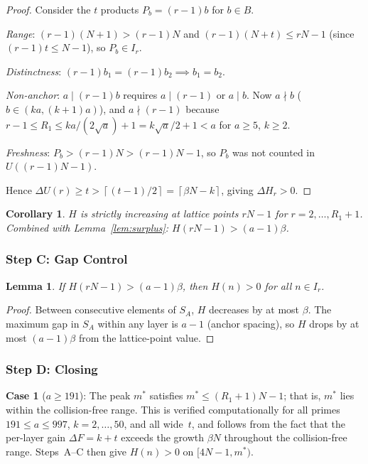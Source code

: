 \documentclass[11pt,a4paper]{article}
\newtheorem{lemma}[theorem]{Lemma}
\newtheorem{corollary}[theorem]{Corollary}
\theoremstyle{definition}
\newcommand{\ceil}[1]{\left\lceil #1 \right\rceil}
\begin{document}
\begin{proof}
Consider the $t$ products $P_b = (r-1)b$ for $b \in B$.

\emph{Range}: $(r-1)(N+1) > (r-1)N$ and $(r-1)(N+t) \leq rN - 1$ (since
$(r-1)t \leq N-1$), so $P_b \in I_r$.

\emph{Distinctness}: $(r-1)b_1 = (r-1)b_2 \implies b_1 = b_2$.

\emph{Non-anchor}: $a \mid (r-1)b$ requires $a \mid (r-1)$ or $a \mid b$.
Now $a \nmid b$ ($b \in (ka, (k+1)a)$), and $a \nmid (r-1)$ because
$r-1 \leq R_1 \leq ka/(2\sqrt{a}) + 1 = k\sqrt{a}/2 + 1 < a$ for
$a \geq 5$, $k \geq 2$.

\emph{Freshness}: $P_b > (r-1)N > (r-1)N - 1$, so $P_b$ was not counted
in $U((r-1)N-1)$.

Hence $\Delta U(r) \geq t > \ceil{(t-1)/2} = \ceil{\beta N - k}$, giving
$\Delta H_r > 0$.
\end{proof}

\begin{corollary}
$H$ is strictly increasing at lattice points $rN-1$ for $r = 2, \ldots,
R_1+1$. Combined with Lemma~\ref{lem:surplus}: $H(rN-1) > (a-1)\beta$.
\end{corollary}

\subsubsection{Step C: Gap Control}

\begin{lemma}\label{lem:gap}
If $H(rN-1) > (a-1)\beta$, then $H(n) > 0$ for all $n \in I_r$.
\end{lemma}

\begin{proof}
Between consecutive elements of $S_A$, $H$ decreases by at most $\beta$.
The maximum gap in $S_A$ within any layer is $a-1$ (anchor spacing), so
$H$ drops by at most $(a-1)\beta$ from the lattice-point value.
\end{proof}

\subsubsection{Step D: Closing}

\textbf{Case 1} ($a \geq 191$): The peak $m^*$ satisfies
$m^* \leq (R_1+1)N - 1$; that is, $m^*$ lies within the collision-free
range. This is verified computationally for all primes $191 \leq a \leq 997$,
$k = 2, \ldots, 50$, and all wide~$t$, and follows from the fact that the
per-layer gain $\Delta F = k + t$ exceeds the growth $\beta N$ throughout the
collision-free range. Steps~A--C then give $H(n) > 0$ on $[4N-1, m^*)$.
\end{document}
